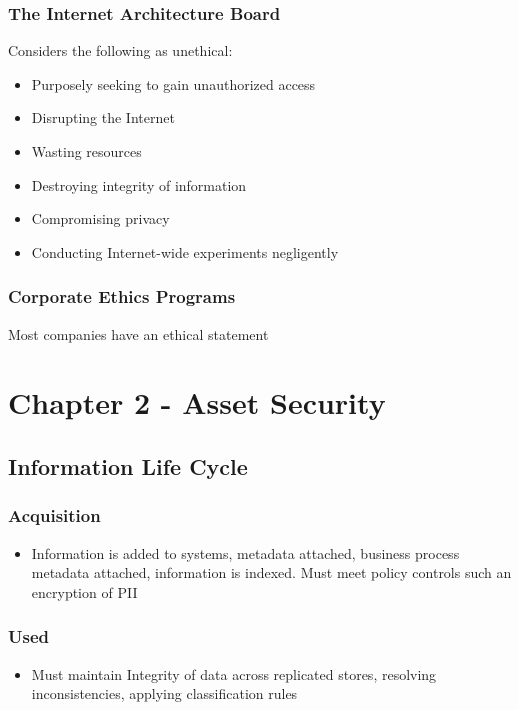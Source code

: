 \documentclass[11pt]{article}
\begin{document}
\subsubsection{The Internet Architecture Board}
\label{sec:orgad2f7c3}
Considers the following as unethical:
\begin{itemize}
\item Purposely seeking to gain unauthorized access
\item Disrupting the Internet
\item Wasting resources
\item Destroying integrity of information
\item Compromising privacy
\item Conducting Internet-wide experiments negligently
\end{itemize}
\subsubsection{Corporate Ethics Programs}
\label{sec:org1d91dae}
Most companies have an ethical statement

\section{Chapter 2 - Asset Security}
\label{sec:orgc4a7ee4}

\subsection{Information Life Cycle}
\label{sec:org224010b}
\subsubsection{Acquisition}
\label{sec:org8415ca4}
\begin{itemize}
\item Information is added to systems, metadata attached, business process metadata attached, information is indexed. Must meet policy controls such an encryption of PII
\end{itemize}
\subsubsection{Used}
\label{sec:orgd45e940}
\begin{itemize}
\item Must maintain Integrity of data across replicated stores, resolving inconsistencies, applying classification rules
\end{itemize}
\end{document}
